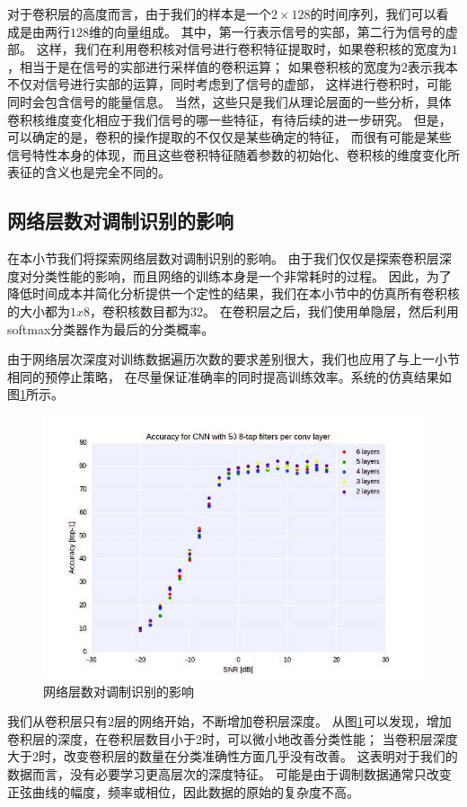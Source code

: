对于卷积层的高度而言，由于我们的样本是一个$2\times128$的时间序列，我们可以看成是由两行$128$维的向量组成。
其中，第一行表示信号的实部，第二行为信号的虚部。
这样，我们在利用卷积核对信号进行卷积特征提取时，如果卷积核的宽度为$1$，相当于是在信号的实部进行采样值的卷积运算；
如果卷积核的宽度为$2$表示我本不仅对信号进行实部的运算，同时考虑到了信号的虚部，
这样进行卷积时，可能同时会包含信号的能量信息。
当然，这些只是我们从理论层面的一些分析，具体卷积核维度变化相应于我们信号的哪一些特征，有待后续的进一步研究。
但是，可以确定的是，卷积的操作提取的不仅仅是某些确定的特征，
而很有可能是某些信号特性本身的体现，而且这些卷积特征随着参数的初始化、卷积核的维度变化所表征的含义也是完全不同的。\par

\subsection{网络层数对调制识别的影响}

在本小节我们将探索网络层数对调制识别的影响。
由于我们仅仅是探索卷积层深度对分类性能的影响，而且网络的训练本身是一个非常耗时的过程。
因此，为了降低时间成本并简化分析提供一个定性的结果，我们在本小节中的仿真所有卷积核的大小都为$1x8$，卷积核数目都为32。
在卷积层之后，我们使用单隐层，然后利用softmax分类器作为最后的分类概率。\par
由于网络层次深度对训练数据遍历次数的要求差别很大，我们也应用了与上一小节相同的预停止策略，
在尽量保证准确率的同时提高训练效率。系统的仿真结果如图\ref{sec:fig_5_3}所示。\par
\begin{figure}[!h]
	\centering
	\includegraphics[scale=1.2]{figures/chapter_5/fig_5_3}
	\caption{网络层数对调制识别的影响}\label{sec:fig_5_3}
\end{figure}
我们从卷积层只有$2$层的网络开始，不断增加卷积层深度。
从图\ref{sec:fig_5_3}可以发现，增加卷积层的深度，在卷积层数目小于2时，可以微小地改善分类性能；
当卷积层深度大于2时，改变卷积层的数量在分类准确性方面几乎没有改善。
这表明对于我们的数据而言，没有必要学习更高层次的深度特征。
可能是由于调制数据通常只改变正弦曲线的幅度，频率或相位，因此数据的原始的复杂度不高。\par


